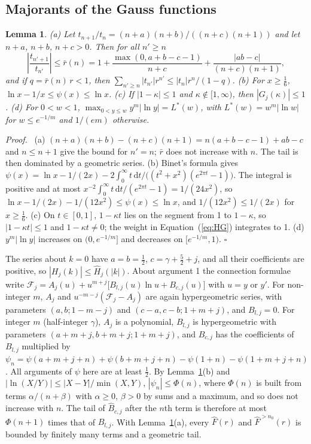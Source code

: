 \documentclass[11pt]{article}
\newtheorem{lemma}{Lemma}
\newenvironment{proof}{\par\noindent\textit{Proof.}\ }{\hfill$\square$\par\medskip}
\newcommand{\dd}{\mathrm{d}}
\begin{document}
\subsection{Majorants of the Gauss functions}

\begin{lemma} \label{lem:maj}
(a) Let $t_{n+1}/t_n=(n+a)(n+b)/((n+c)(n+1))$ and let $n+a$, $n+b$, $n+c>0$. Then for all $n'\ge n$
\begin{equation}
\left|\frac{t_{n'+1}}{t_{n'}}\right|\le\bar r(n)=1+\frac{\max(0,a+b-c-1)}{n+c}+\frac{|ab-c|}{(n+c)(n+1)}, \label{eq:rbar}
\end{equation}
and if $q=\bar r(n)\,r<1$, then $\sum_{n'\ge n}|t_{n'}|r^{n'}\le|t_n|r^n/(1-q)$.
(b) For $x\ge\tfrac16$, $\ln x-1/x\le\psi(x)\le\ln x$.
(c) If $|1-\kappa|\le1$ and $\kappa\notin[1,\infty)$, then $|G_j(\kappa)|\le1$.
(d) For $0<w<1$, $\max_{0<y\le w}y^m|\ln y|=L^*(w)$, with $L^*(w)=w^m|\ln w|$ for $w\le e^{-1/m}$ and $1/(em)$ otherwise.
\end{lemma}

\begin{proof}
(a) $(n+a)(n+b)-(n+c)(n+1)=n(a+b-c-1)+ab-c$ and $n\le n+1$ give the bound for $n'=n$; $\bar r$ does not increase with $n$. The tail is then dominated by a geometric series.
(b) Binet's formula \citep[5.9.13]{DLMF} gives $\psi(x)=\ln x-1/(2x)-2\int_0^\infty t\,\dd t/\bigl((t^2+x^2)(e^{2\pi t}-1)\bigr)$. The integral is positive and at most $x^{-2}\int_0^\infty t\,\dd t/(e^{2\pi t}-1)=1/(24x^2)$, so $\ln x-1/(2x)-1/(12x^2)\le\psi(x)\le\ln x$, and $1/(12x^2)\le1/(2x)$ for $x\ge\tfrac16$.
(c) On $t\in[0,1]$, $1-\kappa t$ lies on the segment from 1 to $1-\kappa$, so $|1-\kappa t|\le1$ and $1-\kappa t\ne0$; the weight in Equation~(\ref{eq:HG}) integrates to 1.
(d) $y^m|\ln y|$ increases on $(0,e^{-1/m}]$ and decreases on $[e^{-1/m},1)$.
\end{proof}

The series about $k=0$ have $a=b=\tfrac12$, $c=\gamma+\tfrac52+j$, and all their coefficients are positive, so $|H_j(k)|\le\hat H_j(|k|)$. About argument 1 the connection formulae \citep[15.8.4, 15.8.10]{DLMF} write $\mathcal F_j=A_j(u)+u^{m+j}\bigl[B_{l,j}(u)\ln u+B_{c,j}(u)\bigr]$ with $u=y$ or $y'$. For non-integer $m$, $A_j$ and $u^{-m-j}(\mathcal F_j-A_j)$ are again hypergeometric series, with parameters $(a,b;1-m-j)$ and $(c-a,c-b;1+m+j)$, and $B_{l,j}=0$. For integer $m$ (half-integer $\gamma$), $A_j$ is a polynomial, $B_{l,j}$ is hypergeometric with parameters $(a+m+j,b+m+j;1+m+j)$, and $B_{c,j}$ has the coefficients of $B_{l,j}$ multiplied by $\psi_n=\psi(a+m+j+n)+\psi(b+m+j+n)-\psi(1+n)-\psi(1+m+j+n)$. All arguments of $\psi$ here are at least $\tfrac12$. By Lemma~\ref{lem:maj}(b) and $|\ln(X/Y)|\le|X-Y|/\min(X,Y)$, $|\psi_n|\le\Phi(n)$, where $\Phi(n)$ is built from terms $\alpha/(n+\beta)$ with $\alpha\ge0$, $\beta>0$ by sums and a maximum, and so does not increase with $n$. The tail of $\hat B_{c,j}$ after the $n$th term is therefore at most $\Phi(n+1)$ times that of $\hat B_{l,j}$. With Lemma~\ref{lem:maj}(a), every $\hat F(r)$ and $\hat F^{>n_0}(r)$ is bounded by finitely many terms and a geometric tail.
\end{document}
